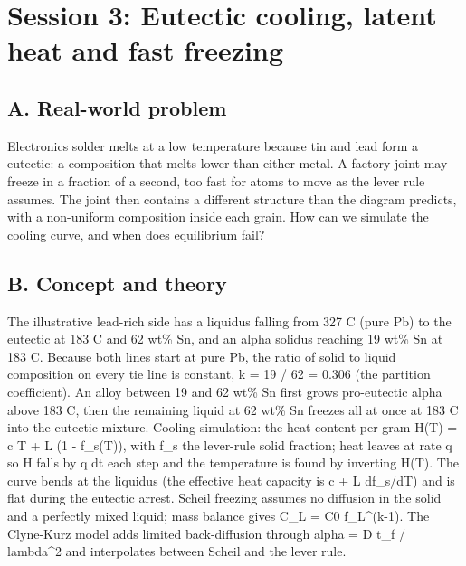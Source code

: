 \documentclass[11pt,a4paper]{article}
\begin{document}
\section{Session 3: Eutectic cooling, latent heat and fast freezing}

\subsection*{A. Real-world problem}
Electronics solder melts at a low temperature because tin and lead form a eutectic: a composition that melts lower than either metal. A factory joint may freeze in a fraction of a second, too fast for atoms to move as the lever rule assumes. The joint then contains a different structure than the diagram predicts, with a non-uniform composition inside each grain. How can we simulate the cooling curve, and when does equilibrium fail?

\subsection*{B. Concept and theory}
The illustrative lead-rich side has a liquidus falling from 327 C (pure Pb) to the eutectic at 183 C and 62 wt\% Sn, and an alpha solidus reaching 19 wt\% Sn at 183 C. Because both lines start at pure Pb, the ratio of solid to liquid composition on every tie line is constant, k = 19 / 62 = 0.306 (the partition coefficient). An alloy between 19 and 62 wt\% Sn first grows pro-eutectic alpha above 183 C, then the remaining liquid at 62 wt\% Sn freezes all at once at 183 C into the eutectic mixture. Cooling simulation: the heat content per gram H(T) = c T + L (1 - f\_s(T)), with f\_s the lever-rule solid fraction; heat leaves at rate q so H falls by q dt each step and the temperature is found by inverting H(T). The curve bends at the liquidus (the effective heat capacity is c + L \textbar{}df\_s/dT\textbar{}) and is flat during the eutectic arrest. Scheil freezing assumes no diffusion in the solid and a perfectly mixed liquid; mass balance gives C\_L = C0 f\_L\textasciicircum{}(k-1). The Clyne-Kurz model adds limited back-diffusion through alpha = D t\_f / lambda\textasciicircum{}2 and interpolates between Scheil and the lever rule.
\end{document}
